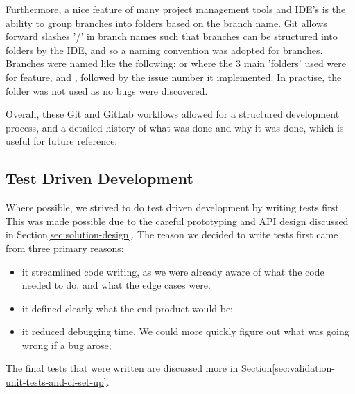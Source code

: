     Furthermore, a nice feature of many project management tools and IDE's is the ability to group branches into folders
    based on the branch name.
    Git allows forward slashes '/' in branch names such that branches can be structured into folders by the IDE, and so
    a naming convention was adopted for branches.
    Branches were named like the following:  or  where the 3 main
    'folders' used were  for feature,  and , followed by
    the issue number it implemented.
    In practise, the  folder was not used as no bugs were discovered.

    Overall, these Git and GitLab workflows allowed for a structured development process, and a detailed history of
    what was done and why it was done, which is useful for future reference.

    \subsection{Test Driven Development}\label{subsec:test-driven-development}
    Where possible, we strived to do test driven development by writing tests first.
    This was made possible due to the careful prototyping and API design discussed in Section\eqref{sec:solution-design}.
    The reason we decided to write tests first came from three primary reasons:
    \begin{itemize}
        \item it streamlined code writing, as we were already aware of what the code needed to do, and what the edge cases
        were.
        \item it defined clearly what the end product would be;
        \item it reduced debugging time.
        We could more quickly figure out what was going wrong if a bug arose;
    \end{itemize}
    The final tests that were written are discussed more in Section\eqref{sec:validation-unit-tests-and-ci-set-up}.

